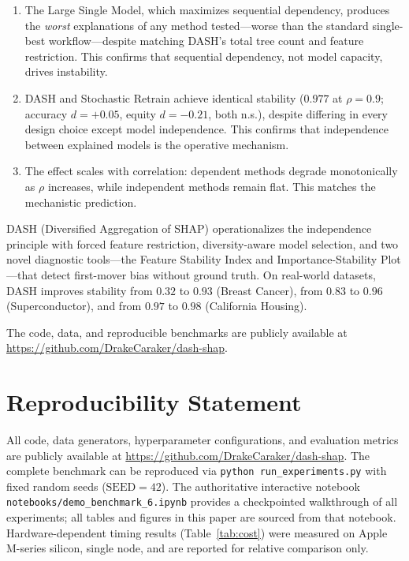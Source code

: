 \documentclass[11pt]{article}
\newcommand{\dash}{\textsc{DASH}}
\newcommand{\rhovar}{\rho}
\begin{document}
\begin{enumerate}
  \item The Large Single Model, which maximizes sequential dependency,
    produces the \emph{worst} explanations of any method tested---worse
    than the standard single-best workflow---despite matching \dash{}'s
    total tree count and feature restriction. This confirms that
    sequential dependency, not model capacity, drives instability.
  \item \dash{} and Stochastic Retrain achieve identical
    stability ($0.977$ at $\rhovar = 0.9$; accuracy $d = +0.05$,
    equity $d = -0.21$, both n.s.),
    despite differing in every design choice except model independence.
    This confirms that independence between explained models is the
    operative mechanism.
  \item The effect scales with correlation: dependent methods degrade
    monotonically as $\rhovar$ increases, while independent methods
    remain flat. This matches the mechanistic prediction.
\end{enumerate}

\dash{} (Diversified Aggregation of SHAP) operationalizes the
independence principle with forced feature restriction, diversity-aware
model selection, and two novel diagnostic tools---the Feature Stability
Index and Importance-Stability Plot---that detect first-mover bias
without ground truth. On real-world datasets, \dash{} improves stability
from $0.32$ to $0.93$ (Breast Cancer), from $0.83$ to $0.96$
(Superconductor), and from $0.97$ to $0.98$ (California Housing).

The code, data, and reproducible benchmarks are publicly available at
\url{https://github.com/DrakeCaraker/dash-shap}.


\section*{Reproducibility Statement}

All code, data generators, hyperparameter configurations, and evaluation
metrics are publicly available at
\url{https://github.com/DrakeCaraker/dash-shap}. The complete benchmark
can be reproduced via \texttt{python run\_experiments.py} with fixed
random seeds ($\text{SEED} = 42$). The authoritative interactive
notebook \texttt{notebooks/demo\_benchmark\_6.ipynb} provides a
checkpointed walkthrough of all experiments; all tables and figures in
this paper are sourced from that notebook. Hardware-dependent timing
results (Table~\ref{tab:cost}) were measured on Apple M-series silicon,
single node, and are reported for relative comparison only.
\end{document}
